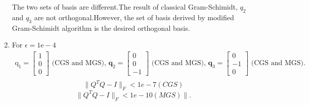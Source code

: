 \documentclass[english,onecolumn]{IEEEtran}
\begin{document}
\begin{enumerate}
The two sets of basis are different.The result of classical Gram-Schimidt, $q_{2}$ and $q_{3}$ are not orthogonal.However,
the set of basis derived by modified Gram-Schimidt algorithm is the desired orthogonal basis.
\item

 For $ \epsilon=1 \mathrm{e}-4$
$$
\begin{aligned}
 \mathrm{q}_{1}=\left[\begin{array}{l}
		1 \\
		0 \\
		0
	\end{array}\right] \text { (CGS and MGS), } \mathbf{q}_{2}=\left[\begin{array}{c}
		0 \\
		0 \\
		-1
	\end{array}\right] \text { (CGS and MGS), } \mathbf{q}_{3}=\left[\begin{array}{c}
		0 \\
		-1 \\
		0
	\end{array}\right] \text { (CGS and MGS). }\\
\end{aligned}
$$
$$
\|Q^{T} Q-I \|_{F}<1 e-7(C G S)
$$
$$
\|Q^{T} Q-I \|_{F}<1 e-10(M G S)\|.
$$


\end{enumerate}
\end{document}
